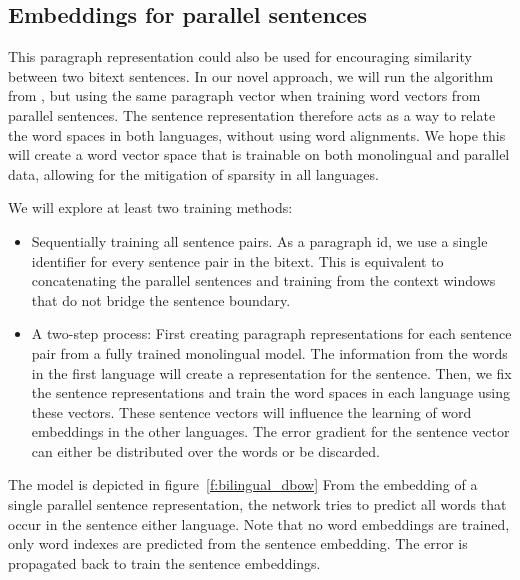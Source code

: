 \subsection{Embeddings for parallel sentences}


This paragraph representation could also be used for encouraging similarity between two bitext sentences.
In our novel approach, we will run the algorithm from \cite{Le2014}, but using the same paragraph vector when training word vectors from parallel sentences.
The sentence representation therefore acts as a way to relate the word spaces in both languages, without using word alignments.
We hope this will create a word vector space that is trainable on both monolingual and parallel data, allowing for the mitigation of sparsity in all languages.

We will explore at least two training methods:
\begin{itemize}
\item 
	Sequentially training all sentence pairs. As a paragraph id, we use a single identifier for every sentence pair in the bitext.
	This is equivalent to concatenating the parallel sentences and training from the context windows that do not bridge the sentence boundary.
\item 
	A two-step process:
	First creating paragraph representations for each sentence pair from a fully trained monolingual model. The information from the words in the first language will create a representation for the sentence.
	Then, we fix the sentence representations and train the word spaces in each language using these vectors.
	These sentence vectors will influence the learning of word embeddings in the other languages.
	The error gradient for the sentence vector can either be distributed over the words or be discarded.
\end{itemize}



The model is depicted in figure~\ref{f:bilingual_dbow}
From the embedding of a single parallel sentence representation, the network tries to predict all words that occur in the sentence either language. Note that no word embeddings are trained, only word indexes are predicted from the sentence embedding. The error is propagated back to train the sentence embeddings.


